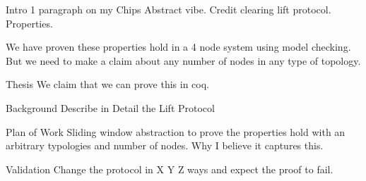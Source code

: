 Intro
1 paragraph on my Chips
Abstract vibe. Credit clearing lift protocol.
Properties.

We have proven these properties hold in a 4 node system using model checking. But we need to make a claim about any number of nodes in any type of topology. 

Thesis
We claim that we can prove this in coq.

Background Describe in Detail the Lift Protocol

Plan of Work
Sliding window abstraction to prove the properties hold with an arbitrary typologies and number of nodes. Why I believe it captures this. 

Validation
Change the protocol in X Y Z ways and expect the proof to fail.